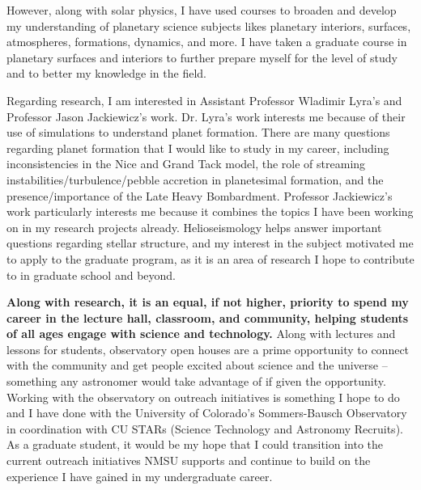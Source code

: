 \documentclass[12pt,letterpaper]{article}
\begin{document}
However, along with solar physics, I have used courses to broaden and develop my understanding of planetary science subjects likes planetary interiors, surfaces, atmospheres, formations, dynamics, and more. I have taken a graduate course in planetary surfaces and interiors to further prepare myself for the level of study and to better my knowledge in the field. 

Regarding research, I am interested in Assistant Professor Wladimir Lyra's and Professor Jason Jackiewicz's work. Dr. Lyra's work interests me because of their use of simulations to understand planet formation. There are many questions regarding planet formation that I would like to study in my career, including inconsistencies in the Nice and Grand Tack model, the role of streaming instabilities/turbulence/pebble accretion in planetesimal formation, and the presence/importance of the Late Heavy Bombardment. Professor Jackiewicz's work particularly interests me because it combines the topics I have been working on in my research projects already. Helioseismology helps answer important questions regarding stellar structure, and my interest in the subject motivated me to apply to the graduate program, as it is an area of research I hope to contribute to in graduate school and beyond. 

\textbf{Along with research, it is an equal, if not higher, priority to spend my career in the lecture hall, classroom, and community, helping students of all ages engage with science and technology.} Along with lectures and lessons for students, observatory open houses are a prime opportunity to connect with the community and get people excited about science and the universe -- something any astronomer would take advantage of if given the opportunity. Working with the observatory on outreach initiatives is something I hope to do and I have done with the University of Colorado’s Sommers-Bausch Observatory in coordination with CU STARs (Science Technology and Astronomy Recruits). As a graduate student, it would be my hope that I could transition into the current outreach initiatives NMSU supports and continue to build on the experience I have gained in my undergraduate career.
\end{document}
